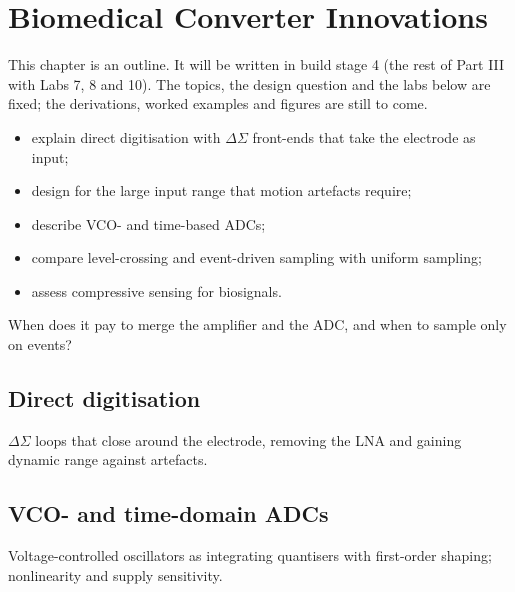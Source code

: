 \chapter{Biomedical Converter Innovations}\label{ch:bioadc}

\begin{specnote}
This chapter is an outline. It will be written in build stage 4 (the rest of Part III with Labs 7, 8 and 10). The topics, the design question and the labs below are fixed; the derivations, worked examples and figures are still to come.
\end{specnote}

\begin{objectives}
\begin{itemize}
  \item explain direct digitisation with $\Delta\Sigma$ front-ends that take the electrode as input;
  \item design for the large input range that motion artefacts require;
  \item describe VCO- and time-based ADCs;
  \item compare level-crossing and event-driven sampling with uniform sampling;
  \item assess compressive sensing for biosignals.
\end{itemize}
\end{objectives}

\begin{insight}
When does it pay to merge the amplifier and the ADC, and when to sample only on events?
\end{insight}

\section{Direct digitisation}\label{sec:ch21-1}
$\Delta\Sigma$ loops that close around the electrode, removing the LNA and gaining dynamic range against artefacts.

\section{VCO- and time-domain ADCs}\label{sec:ch21-2}
Voltage-controlled oscillators as integrating quantisers with first-order shaping; nonlinearity and supply sensitivity.

